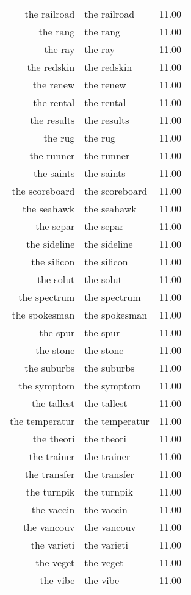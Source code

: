 \begin{table}[ht]
\begin{tabular}{rlr}
  the railroad & the railroad & 11.00 \\ 
  the rang & the rang & 11.00 \\ 
  the ray & the ray & 11.00 \\ 
  the redskin & the redskin & 11.00 \\ 
  the renew & the renew & 11.00 \\ 
  the rental & the rental & 11.00 \\ 
  the results & the results & 11.00 \\ 
  the rug & the rug & 11.00 \\ 
  the runner & the runner & 11.00 \\ 
  the saints & the saints & 11.00 \\ 
  the scoreboard & the scoreboard & 11.00 \\ 
  the seahawk & the seahawk & 11.00 \\ 
  the separ & the separ & 11.00 \\ 
  the sideline & the sideline & 11.00 \\ 
  the silicon & the silicon & 11.00 \\ 
  the solut & the solut & 11.00 \\ 
  the spectrum & the spectrum & 11.00 \\ 
  the spokesman & the spokesman & 11.00 \\ 
  the spur & the spur & 11.00 \\ 
  the stone & the stone & 11.00 \\ 
  the suburbs & the suburbs & 11.00 \\ 
  the symptom & the symptom & 11.00 \\ 
  the tallest & the tallest & 11.00 \\ 
  the temperatur & the temperatur & 11.00 \\ 
  the theori & the theori & 11.00 \\ 
  the trainer & the trainer & 11.00 \\ 
  the transfer & the transfer & 11.00 \\ 
  the turnpik & the turnpik & 11.00 \\ 
  the vaccin & the vaccin & 11.00 \\ 
  the vancouv & the vancouv & 11.00 \\ 
  the varieti & the varieti & 11.00 \\ 
  the veget & the veget & 11.00 \\ 
  the vibe & the vibe & 11.00 \\ 

\end{tabular}
\end{table}
